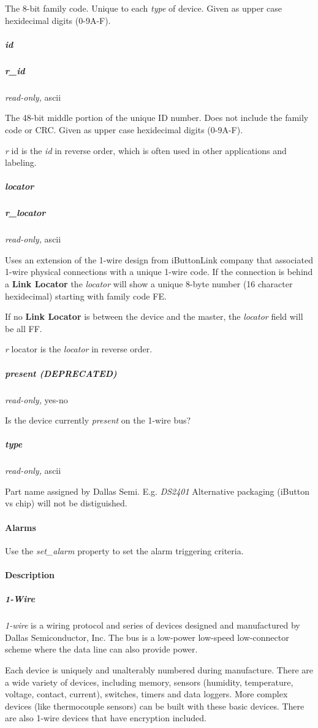 The 8-bit family code. Unique to each \textit{type} of device. Given as upper case
hexidecimal digits (0-9A-F). 
\subparagraph*{id}
\subparagraph*{r\_id}\textit{read-only,} ascii 

The 48-bit middle portion of the unique ID number. Does not include the family
code or CRC. Given as upper case hexidecimal digits (0-9A-F). 

\textit{r} id is the \textit{id} in reverse order, which is often used in other applications
and labeling. 
\subparagraph*{locator}
\subparagraph*{r\_locator}\textit{read-only,} ascii 

Uses an extension of the 1-wire design from iButtonLink company that associated
1-wire physical connections with a unique 1-wire code. If the connection is
behind a \textbf{Link Locator} the \textit{locator} will show a unique 8-byte number (16 character
hexidecimal) starting with family code FE. 

If no \textbf{Link Locator} is between the device and the master, the \textit{locator} field
will be all FF. 

\textit{r} locator is the \textit{locator} in reverse order. 
\subparagraph*{present (DEPRECATED)}\textit{read-only,}
yes-no 

Is the device currently \textit{present} on the 1-wire bus? 
\subparagraph*{type}\textit{read-only,} ascii 

Part name assigned by Dallas Semi. E.g. \textit{DS2401} Alternative packaging (iButton
vs chip) will not be distiguished.  
\paragraph*{Alarms}
Use the \textit{set\_alarm} property to
set the alarm triggering criteria. 
\paragraph*{Description}
          
\subparagraph*{1-Wire}\textit{1-wire}  is a
wiring protocol and series of devices designed and manufactured by Dallas
Semiconductor, Inc. The bus is a low-power low-speed low-connector scheme where
the data line can also provide power. 

Each device is uniquely and unalterably
numbered during manufacture. There are a wide variety of devices, including
memory, sensors (humidity, temperature, voltage, contact, current), switches,
timers and data loggers. More complex devices (like thermocouple sensors)
can be built with these basic devices. There are also 1-wire devices that
have encryption included. 

